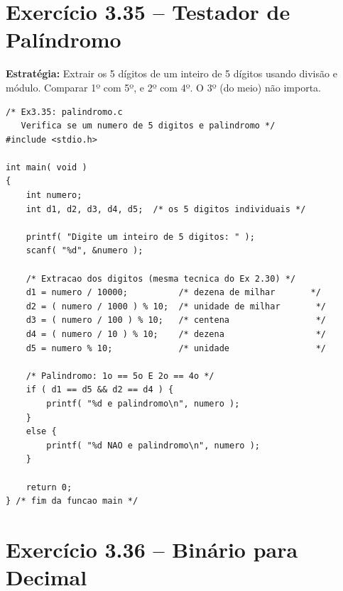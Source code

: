 \documentclass[12pt,a4paper]{article}
\begin{document}
\newpage

\section{Exercício 3.35 -- Testador de Palíndromo}

\begin{respostabox}
\textbf{Estratégia:} Extrair os 5 dígitos de um inteiro de 5 dígitos usando
divisão e módulo. Comparar 1º com 5º, e 2º com 4º. O 3º (do meio) não importa.

\begin{lstlisting}
/* Ex3.35: palindromo.c
   Verifica se um numero de 5 digitos e palindromo */
#include <stdio.h>

int main( void )
{
    int numero;
    int d1, d2, d3, d4, d5;  /* os 5 digitos individuais */

    printf( "Digite um inteiro de 5 digitos: " );
    scanf( "%d", &numero );

    /* Extracao dos digitos (mesma tecnica do Ex 2.30) */
    d1 = numero / 10000;          /* dezena de milhar       */
    d2 = ( numero / 1000 ) % 10;  /* unidade de milhar       */
    d3 = ( numero / 100 ) % 10;   /* centena                 */
    d4 = ( numero / 10 ) % 10;    /* dezena                  */
    d5 = numero % 10;             /* unidade                 */

    /* Palindromo: 1o == 5o E 2o == 4o */
    if ( d1 == d5 && d2 == d4 ) {
        printf( "%d e palindromo\n", numero );
    }
    else {
        printf( "%d NAO e palindromo\n", numero );
    }

    return 0;
} /* fim da funcao main */
\end{lstlisting}
\end{respostabox}

\section{Exercício 3.36 -- Binário para Decimal}
\end{document}
